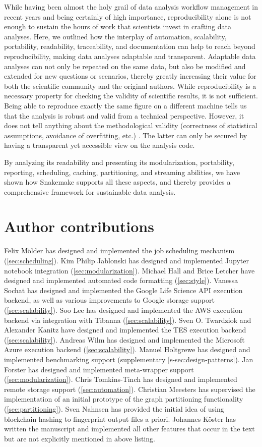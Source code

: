 \documentclass[parskip=half]{scrartcl}
\begin{document}
While having been almost the holy grail of data analysis workflow management in recent years and being certainly of high importance, reproducibility alone is not enough to sustain the hours of work that scientists invest in crafting data analyses.
Here, we outlined how the interplay of automation, scalability, portability, readability, traceability, and documentation can help to reach beyond reproducibility, making data analyses adaptable and transparent.
Adaptable data analyses can not only be repeated on the same data, but also be modified and extended for new questions or scenarios, thereby greatly increasing their value for both the scientific community and the original authors.
While reproducibility is a necessary property for checking the validity of scientific results, it is not sufficient.
Being able to reproduce exactly the same figure on a different machine tells us that the analysis is robust and valid from a technical perspective.
However, it does not tell anything about the methodological validity (correctness of statistical assumptions, avoidance of overfitting, etc.)
.
The latter can only be secured by having a transparent yet accessible view on the analysis code.

By analyzing its readability and presenting its modularization, portability, reporting, scheduling, caching, partitioning, and streaming abilities, we have shown how Snakemake supports all these aspects, and thereby provides a comprehensive framework for sustainable data analysis.

\section{Author contributions}
Felix Mölder has designed and implemented the job scheduling mechanism (\autoref{sec:scheduling}).
Kim Philip Jablonski has designed and implemented Jupyter notebook integration (\autoref{sec:modularization}).
Michael Hall and Brice Letcher have designed and implemented automated code formatting (\autoref{sec:style}).
Vanessa Sochat has designed and implemented the Google Life Science API execution backend, as well as various improvements to Google storage support (\autoref{sec:scalability}).
Soo Lee has designed and implemented the AWS execution backend via integration with Tibanna (\autoref{sec:scalability}).
Sven O.
Twardziok and Alexander Kanitz have designed and implemented the TES execution backend (\autoref{sec:scalability}).
Andreas Wilm has designed and implemented the Microsoft Azure execution backend (\autoref{sec:scalability}).
Manuel Holtgrewe has designed and implemented benchmarking support (supplementary \autoref{s-sec:design-patterns}).
Jan Forster has designed and implemented meta-wrapper support (\autoref{sec:modularization}).
Chris Tomkins-Tinch has designed and implemented remote storage support (\autoref{sec:automation}).
Christian Meesters has supervised the implementation of an initial prototype of the graph partitioning functionality (\autoref{sec:partitioning}).
Sven Nahnsen has provided the initial idea of using blockchain hashing to fingerprint output files a priori.
Johannes Köster has written the manuscript and implemented all other features that occur in the text but are not explicitly mentioned in above listing.
\end{document}

